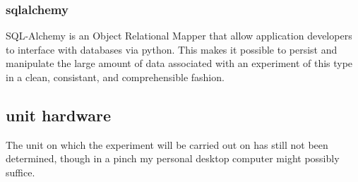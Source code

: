 \documentclass[a4paper,11pt]{article}
\begin{document}
\subsubsection{sqlalchemy}
SQL-Alchemy is an Object Relational Mapper that allow application developers to interface with
databases via python. This makes it possible to persist and manipulate the large amount of data
associated with an experiment of this type in a clean, consistant, and comprehensible fashion.

\subsection{unit hardware}
The unit on which the experiment will be carried out on has still not been determined, though in
a pinch my personal desktop computer might possibly suffice.
\end{document}
